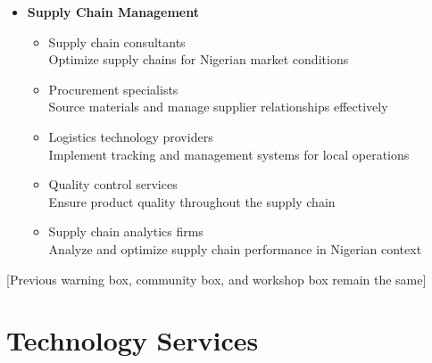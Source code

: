\begin{tcolorbox}[
    colback=white,
    colframe=primarydark,
    title=\textbf{Logistics Service Providers},
    before skip=1em,
    after skip=1em
]
\begin{itemize}[leftmargin=*,itemsep=0.5em]
        \vspace{0.5em}

        \item \textbf{Supply Chain Management}
        \begin{itemize}[itemsep=0.3em]
            \item Supply chain consultants \\
                \small{Optimize supply chains for Nigerian market conditions}
            \item Procurement specialists \\
                \small{Source materials and manage supplier relationships effectively}
            \item Logistics technology providers \\
                \small{Implement tracking and management systems for local operations}
            \item Quality control services \\
                \small{Ensure product quality throughout the supply chain}
            \item Supply chain analytics firms \\
                \small{Analyze and optimize supply chain performance in Nigerian context}
        \end{itemize}
    \end{itemize}
\end{tcolorbox}

[Previous warning box, community box, and workshop box remain the same]

\section{Technology Services}\label{sec:technology-services}
\vspace{1em}

